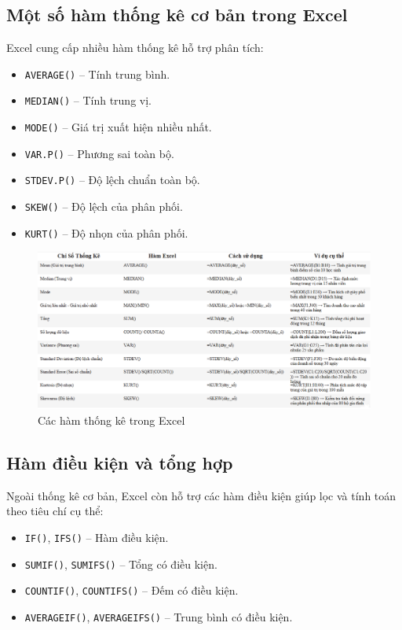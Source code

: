 \documentclass[11pt]{article}
\begin{document}
\subsection{Một số hàm thống kê cơ bản trong Excel}
Excel cung cấp nhiều hàm thống kê hỗ trợ phân tích:
\begin{itemize}
    \item \texttt{AVERAGE()} – Tính trung bình.
    \item \texttt{MEDIAN()} – Tính trung vị.
    \item \texttt{MODE()} – Giá trị xuất hiện nhiều nhất.
    \item \texttt{VAR.P()} – Phương sai toàn bộ.
    \item \texttt{STDEV.P()} – Độ lệch chuẩn toàn bộ.
    \item \texttt{SKEW()} – Độ lệch của phân phối.
    \item \texttt{KURT()} – Độ nhọn của phân phối.
\end{itemize}

\begin{figure}[H]
    \centering
    \includegraphics[width=1\linewidth]{images/stastical_func.png}
    \caption{Các hàm thống kê trong Excel}
    \label{fig:Excel Statistical FUnc}
\end{figure}

\subsection{Hàm điều kiện và tổng hợp}
Ngoài thống kê cơ bản, Excel còn hỗ trợ các hàm điều kiện giúp lọc và tính toán theo tiêu chí cụ thể:
\begin{itemize}
    \item \texttt{IF()}, \texttt{IFS()} – Hàm điều kiện.
    \item \texttt{SUMIF()}, \texttt{SUMIFS()} – Tổng có điều kiện.
    \item \texttt{COUNTIF()}, \texttt{COUNTIFS()} – Đếm có điều kiện.
    \item \texttt{AVERAGEIF()}, \texttt{AVERAGEIFS()} – Trung bình có điều kiện.
\end{itemize}
\end{document}
